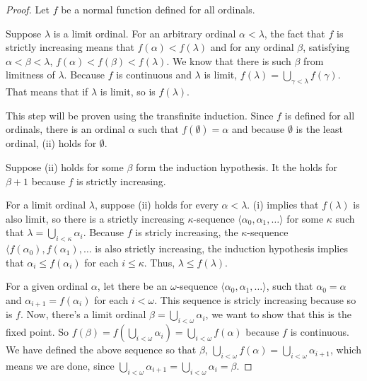 \begin{proof}
Let $f$ be a normal function defined for all ordinals.
\bce[(i)]
\item %
Suppose $\lambda$ is a limit ordinal. 
For an arbitrary ordinal $\alpha < \lambda$, the fact that $f$ is strictly increasing means that $f(\alpha) < f(\lambda)$ and for any ordinal $\beta$, 
satisfying $\alpha < \beta < \lambda$, $f(\alpha) < f(\beta) < f(\lambda)$. 
We know that there is such $\beta$ from limitness of $\lambda$.
Because $f$ is continuous and $\lambda$ is limit, $f(\lambda) = \bigcup_{\gamma < \lambda} f(\gamma)$.%
That means that if $\lambda$ is limit, so is $f(\lambda)$.

\item This step will be proven using the transfinite induction.
Since $f$ is defined for all ordinals, there is an ordinal $\alpha$ such that $f(\emptyset) = \alpha$ and because $\emptyset$ is the least ordinal, (ii) holds for $\emptyset$.

Suppose (ii) holds for some $\beta$ form the induction hypothesis. It the holds for $\beta+1$ because $f$ is strictly increasing. 

For a limit ordinal $\lambda$, suppose (ii) holds for every $\alpha < \lambda$. (i) implies that $f(\lambda)$ is also limit, 
so there is a strictly increasing $\kappa$-sequence $\langle \alpha_0, \alpha_1, \ldots \rangle$ for some $\kappa$ such that $\lambda = \bigcup_{i<\kappa} \alpha_i$. Because $f$ is stricly increasing, the $\kappa$-sequence $\langle f(\alpha_0), f(\alpha_1), \ldots$ is also strictly increasing, the induction hypothesis implies that $\alpha_i \leq f(\alpha_i)$ for each $i \leq \kappa$. Thus, $\lambda \leq f(\lambda)$.

\item For a given ordinal $\alpha$, let there be an $\omega$-sequence $\langle \alpha_0, \alpha_1, \ldots \rangle$, 
such that $\alpha_0 = \alpha$ and $\alpha_{i+1} = f(\alpha_i)$ for each $i < \omega$.
This sequence is stricly increasing because so is $f$. 
Now, there's a limit ordinal $\beta = \bigcup_{i < \omega} \alpha_i$, we want to show that this is the fixed point. 
So $f(\beta) = f(\bigcup_{i < \omega} \alpha_i) = \bigcup_{i < \omega} f(\alpha)$ because $f$ is continuous. 
We have defined the above sequence so that $\beta$, $\bigcup_{i < \omega} f(\alpha) = \bigcup_{i < \omega} \alpha_{i+1}$, 
which means we are done, since $\bigcup_{i < \omega} \alpha_{i+1} = \bigcup_{i < \omega} \alpha_{i}  = \beta$.


\end{proof}
